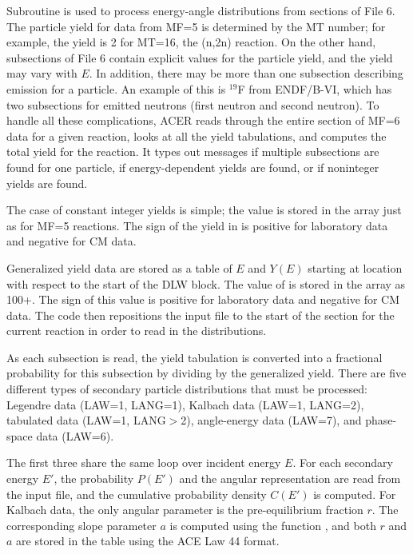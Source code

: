 Subroutine  is used
to process energy-angle distributions from sections of File 6.
 The particle yield for data from MF=5 is determined by
the MT number; for example, the yield is 2 for MT=16, the
(n,2n) reaction.  On the other hand, subsections
of File 6 contain explicit values for the particle yield, and the
yield may vary with $E$.  In addition, there may be more than one
subsection describing emission for a particle.  An example of this
is $^{19}$F from ENDF/B-VI, which has two subsections for emitted
neutrons (first neutron and second neutron).  To handle all these
complications, ACER reads through the entire section of MF=6 data
for a given reaction, looks at all the yield tabulations, and
computes the total yield for the reaction.  It types out messages
if multiple subsections are found for one particle, if
energy-dependent yields are found, or if noninteger yields are
found.

The case of constant integer yields is simple; the value is
stored in the  array just as for MF=5 reactions.
The sign of the yield in  is positive for laboratory
data and negative for CM data.

Generalized yield data are stored as a table of $E$ and $Y(E)$
starting at location  with respect to the start
of the DLW block.  The value of  is stored in the
 array as 100+.  The sign of this value
is positive for laboratory data and negative for CM data.
The code then repositions the input file to the start of the
section for the current reaction in order to read in the
distributions.

As each subsection is read, the yield tabulation is converted into
a fractional probability for this subsection by dividing by the
generalized yield.  There are five different types of secondary
particle distributions that must be processed: Legendre data
(LAW=1, LANG=1), Kalbach data (LAW=1, LANG=2), tabulated data
(LAW=1, LANG$>$2), angle-energy data (LAW=7), and phase-space data
(LAW=6).

The first three share the same loop over incident energy $E$.
For each secondary energy $E'$, the probability $P(E')$ and
the angular representation are read from the input file,
and the cumulative probability density $C(E')$ is computed.
For Kalbach data, the only angular parameter is the pre-equilibrium
fraction $r$.  The corresponding slope parameter $a$ is
computed using the function ,
and both $r$ and $a$ are stored in the table using the ACE Law 44 format.

